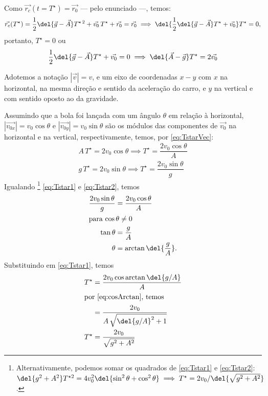 \documentclass[]{IMTexam}
\begin{document}
\begin{questions}
\begin{solution}
		Como $ \vec{r_c}(t=T^{\star})=\vec{r_0} $ --- pelo enunciado ---, temos:
		\[ \vec{r_c}(T^{\star})=\dfrac{1}{2}\del{\vec{g}-\vec{A}}T^{\star\,2}+\vec{v_0}\,T^{\star}+\vec{r_0}=\vec{r_0}\implies \del{\dfrac{1}{2}\del{\vec{g}-\vec{A}}T^{\star}+\vec{v_0}}T^{\star}=0, \]
		portanto, $ T^{\star}=0 $ ou
		\begin{equation}\label{eq:TstarVec}
			\dfrac{1}{2}\del{\vec{g}-\vec{A}}T^{\star}+\vec{v_0}=0\implies \del{\vec{A}-\vec{g}}T^{\star}=2\vec{v_0}
		\end{equation}

		Adotemos a notação $ |\vec{v}|=v $, e um eixo de coordenadas $ x-y $ com $ x $ na horizontal, na mesma direção e sentido da aceleração do carro, e $ y $ na vertical e com sentido oposto ao da gravidade.

		Assumindo que a bola foi lançada com um ângulo $ \theta $ em relação à horizontal, $ |\vec{v_{0x}}|=v_0\cos\theta $ e $ |\vec{v_{0y}}|=v_0\sin\theta $ são os módulos das componentes de $\vec{v_0}$ na horizontal e na vertical, respectivamente, temos, por \ref{eq:TstarVec}:
		\begin{gather}
			A\,T^{\star}=2v_0\cos\theta\implies T^{\star}=\dfrac{2v_0\cos\theta}{A}\label{eq:Tstar1}\\
			g\,T^{\star}=2v_0\sin\theta\implies
			T^{\star}=\dfrac{2v_0\sin\theta}{g}\label{eq:Tstar2}
		\end{gather}
		Igualando%
		\footnote{Alternativamente, podemos somar os quadrados de \ref{eq:Tstar1} e \ref{eq:Tstar2}: $ \del{g^{2}+A^{2}}T^{\star2}=4v_0^{2}\del{\sin^{2}\theta+\cos^{2}\theta}\implies T^{\star}=2v_0/\del{\sqrt{g^{2}+A^{2}}} $.}%
		\ref{eq:Tstar1} e \ref{eq:Tstar2}, temos
		\begin{align*}
			\dfrac{2v_0\sin\theta}{g} & =\dfrac{2v_0\cos\theta}{A}   \\
			\intertext{para $ \cos\theta\neq0 $}
			\tan\theta                & =\dfrac{g}{A}                \\
			\theta                    & =\arctan \del{\dfrac{g}{A}}.
		\end{align*}
		Substituindo em \ref{eq:Tstar1}, temos
		\begin{align*}
			T^{\star} & =\dfrac{2v_0\cos\arctan \del{g/A}}{A}    \\
			\intertext{por \ref{eq:cosArctan}, temos}
			          & =\dfrac{2v_0}{A\,\sqrt{\del{g/A}^{2}+1}} \\
			T^{\star} & =\dfrac{2v_0}{\sqrt{g^{2}+A^{2}}}
		\end{align*}


\end{solution}
\end{questions}
\end{document}
